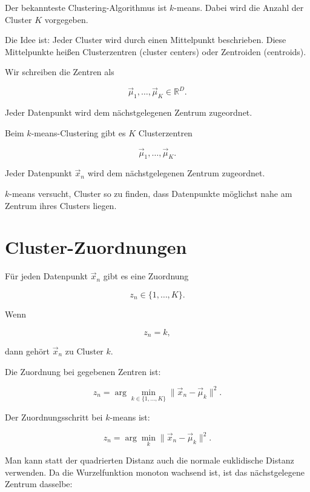 Der bekannteste Clustering-Algorithmus ist \(k\)-means.
Dabei wird die Anzahl der Cluster \(K\) vorgegeben.

Die Idee ist:
Jeder Cluster wird durch einen Mittelpunkt beschrieben.
Diese Mittelpunkte heißen Clusterzentren (cluster centers) oder Zentroiden (centroids).

Wir schreiben die Zentren als

\[
    \vec{\mu}_1,\dots,\vec{\mu}_K
    \in
    \mathbb{R}^D.
\]

Jeder Datenpunkt wird dem nächstgelegenen Zentrum zugeordnet.

\begin{definitionbox}
Beim \(k\)-means-Clustering gibt es \(K\) Clusterzentren

\[
    \vec{\mu}_1,\dots,\vec{\mu}_K.
\]

Jeder Datenpunkt \(\vec{x}_n\) wird dem nächstgelegenen Zentrum zugeordnet.
\end{definitionbox}

\begin{conceptbox}
\(k\)-means versucht, Cluster so zu finden, dass Datenpunkte möglichst nahe am Zentrum ihres Clusters liegen.
\end{conceptbox}

\section{Cluster-Zuordnungen}

Für jeden Datenpunkt \(\vec{x}_n\) gibt es eine Zuordnung

\[
    z_n\in\{1,\dots,K\}.
\]

Wenn

\[
    z_n=k,
\]

dann gehört \(\vec{x}_n\) zu Cluster \(k\).

Die Zuordnung bei gegebenen Zentren ist:

\[
    z_n
    =
    \arg\min_{k\in\{1,\dots,K\}}
    \|\vec{x}_n-\vec{\mu}_k\|^2.
\]

\begin{definitionbox}
Der Zuordnungsschritt bei \(k\)-means ist:

\[
    z_n
    =
    \arg\min_k
    \|\vec{x}_n-\vec{\mu}_k\|^2.
\]
\end{definitionbox}

Man kann statt der quadrierten Distanz auch die normale euklidische Distanz verwenden.
Da die Wurzelfunktion monoton wachsend ist, ist das nächstgelegene Zentrum dasselbe:

